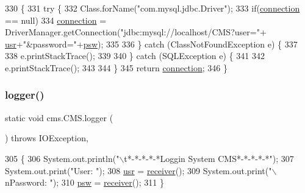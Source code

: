 \begin{DoxyCode}
330                                             \{
331         \textcolor{keywordflow}{try} \{
332             Class.forName(\textcolor{stringliteral}{"com.mysql.jdbc.Driver"});
333             \textcolor{keywordflow}{if}(\mbox{\hyperlink{classcms_1_1_c_m_s_afc28cfd2c4356509b85775219b7b1e05}{connection}} == null)
334                 \mbox{\hyperlink{classcms_1_1_c_m_s_afc28cfd2c4356509b85775219b7b1e05}{connection}} = DriverManager.getConnection(\textcolor{stringliteral}{"jdbc:mysql://localhost/CMS?user="}+
      \mbox{\hyperlink{classcms_1_1_c_m_s_acce8f8027f3a43eabae951ddf2a9c5d9}{usr}}+\textcolor{stringliteral}{"&password="}+\mbox{\hyperlink{classcms_1_1_c_m_s_a84681758bb3035a56a9bf541f47a6964}{psw}});
335  
336         \} \textcolor{keywordflow}{catch} (ClassNotFoundException e) \{
337  
338             e.printStackTrace();
339              
340         \} \textcolor{keywordflow}{catch} (SQLException e) \{
341              
342             e.printStackTrace();
343              
344         \}
345         \textcolor{keywordflow}{return} \mbox{\hyperlink{classcms_1_1_c_m_s_afc28cfd2c4356509b85775219b7b1e05}{connection}};
346     \}
\end{DoxyCode}
\mbox{\label{classcms_1_1_c_m_s_a8c344bccd734ba0a3dbadb99d2fcbed1}} 
\subsubsection{\texorpdfstring{logger()}{logger()}}
{\footnotesize\ttfamily static void cms.\+C\+M\+S.\+logger (\begin{DoxyParamCaption}{ }\end{DoxyParamCaption}) throws I\+O\+Exception\hspace{0.3cm}{\ttfamily [inline]}, {\ttfamily [static]}}


\begin{DoxyCode}
305                                                   \{
306         System.out.println(\textcolor{stringliteral}{"\(\backslash\)t*-*-*-*-*Loggin System CMS*-*-*-*-*"});
307         System.out.print(\textcolor{stringliteral}{"User: "});
308         \mbox{\hyperlink{classcms_1_1_c_m_s_acce8f8027f3a43eabae951ddf2a9c5d9}{usr}} = \mbox{\hyperlink{classcms_1_1_c_m_s_ad13be0e97a0bb295dcedd134942a79b4}{receiver}}();
309         System.out.print(\textcolor{stringliteral}{"\(\backslash\)nPassword: "});
310         \mbox{\hyperlink{classcms_1_1_c_m_s_a84681758bb3035a56a9bf541f47a6964}{psw}} = \mbox{\hyperlink{classcms_1_1_c_m_s_ad13be0e97a0bb295dcedd134942a79b4}{receiver}}();
311     \}
\end{DoxyCode}
\mbox{\label{classcms_1_1_c_m_s_a5c480aa2373ca60f78bcdf467c09d1d9}} 
